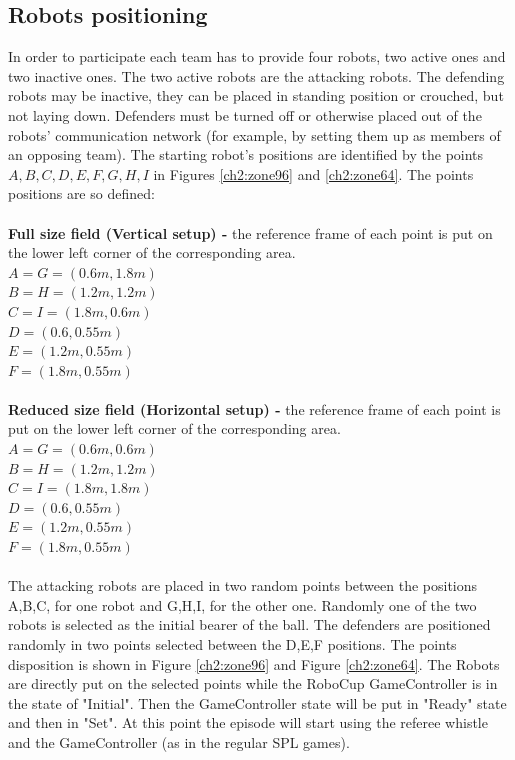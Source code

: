 \subsection{Robots positioning}
In order to participate each team has to provide four robots, two active ones and two inactive ones. The two active robots are the attacking robots. The defending robots may be inactive, they can be placed in standing position or crouched, but not laying down.
Defenders must be turned off or otherwise placed out of the robots' communication network (for example, by setting them up as members of an opposing team).
The starting robot's positions are identified by the points ${A,B,C,D,E,F,G,H,I}$ in Figures \ref{ch2:zone96} and \ref{ch2:zone64}.
The points positions are so defined:
\\
\\
\textbf{Full size field (Vertical setup) -} the reference frame of each point is put on the lower left corner of the corresponding area.
\\
$A = G = (0.6m, 1.8m)$
\\
$B = H = (1.2m, 1.2m)$
\\
$C = I = (1.8m, 0.6m)$
\\
$D = (0.6, 0.55m)$
\\
$E = (1.2m, 0.55m)$
\\
$F = (1.8m, 0.55m)$
\\
\\
\textbf{Reduced size field (Horizontal setup) -} the reference frame of each point is put on the lower left corner of the corresponding area.
\\
$A = G = (0.6m, 0.6m)$
\\
$B = H = (1.2m, 1.2m)$
\\
$C = I = (1.8m, 1.8m)$
\\
$D = (0.6, 0.55m)$
\\
$E = (1.2m, 0.55m)$
\\
$F = (1.8m, 0.55m)$
\\
\\
The attacking robots are placed in two random points between the positions A,B,C, for one robot and G,H,I, for the other one.  Randomly one of the two robots is selected as the initial bearer of the ball. The defenders are positioned randomly in two points selected between the D,E,F positions.
The points disposition is shown in Figure \ref{ch2:zone96} and Figure \ref{ch2:zone64}.
The Robots are directly put on the selected points while the RoboCup GameController is in the state of "Initial". Then the GameController state will be put in "Ready" state and then in "Set". At this point the episode will start using the referee whistle and the GameController (as in the regular SPL games). 

